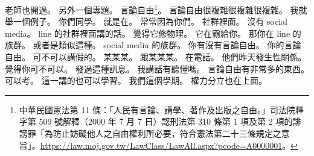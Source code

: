 \hypertarget{c01:cue:833}{}老師也開過。
\hypertarget{c01:cue:834}{}另外一個專題。
\hypertarget{c01:cue:835}{}言論自由\footnote{中華民國憲法第 11 條：「人民有言論、講學、著作及出版之自由。」司法院釋字第 509 號解釋（2000 年 7 月 7 日）認刑法第 310 條第 1 項及第 2 項的誹謗罪「為防止妨礙他人之自由權利所必要，符合憲法第二十三條規定之意旨」。\url{https://law.moj.gov.tw/LawClass/LawAll.aspx?pcode=A0000001}。}。
\hypertarget{c01:cue:836}{}言論自由很複雜很複雜很複雜。
\hypertarget{c01:cue:837}{}我就舉一個例子。
\hypertarget{c01:cue:838}{}你們同學。
\hypertarget{c01:cue:839}{}就是在。
\hypertarget{c01:cue:840}{}常常因為你們。
\hypertarget{c01:cue:841}{}社群裡面。
\hypertarget{c01:cue:842}{}沒有 social media。
\hypertarget{c01:cue:843}{}line 的社群裡面講的話。
\hypertarget{c01:cue:844}{}覺得它修物理。
\hypertarget{c01:cue:845}{}它在霸給你。
\hypertarget{c01:cue:846}{}那你在 line 的族群。
\hypertarget{c01:cue:847}{}或者是類似這種。
\hypertarget{c01:cue:848}{}social media 的族群。
\hypertarget{c01:cue:849}{}你有沒有言論自由。
\hypertarget{c01:cue:850}{}你的言論自由。
\hypertarget{c01:cue:851}{}可不可以講假的。
\hypertarget{c01:cue:852}{}某某某。
\hypertarget{c01:cue:853}{}跟某某某。
\hypertarget{c01:cue:854}{}在電話。
\hypertarget{c01:cue:855}{}他們昨天發生性關係。
\hypertarget{c01:cue:856}{}覺得你可不可以。
\hypertarget{c01:cue:857}{}發過這種訊息。
\hypertarget{c01:cue:858}{}我講話有聽懂嗎。
\hypertarget{c01:cue:859}{}言論自由有非常多的東西。
\hypertarget{c01:cue:860}{}可以考。
\hypertarget{c01:cue:861}{}這一講的也可以學習。
\hypertarget{c01:cue:862}{}我們這個學期。
\hypertarget{c01:cue:863}{}權力分立也在上面。

